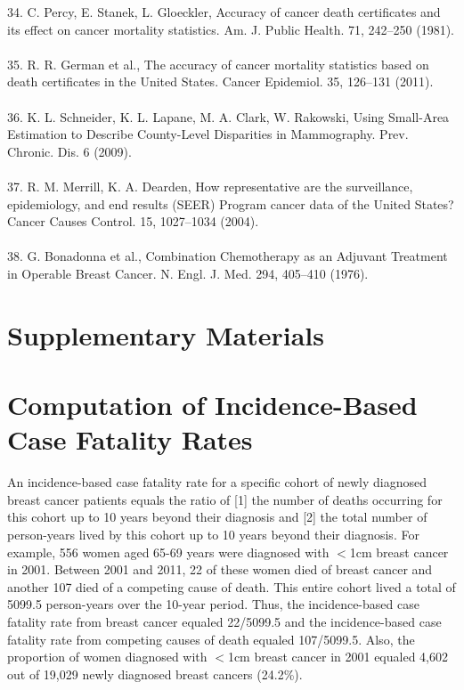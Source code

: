 \documentclass[11pt,letterpaper]{article}
\theoremstyle{plain}
\theoremstyle{remark}
\numberwithin{equation}{section}
\begin{document}
34. 	C. Percy, E. Stanek, L. Gloeckler, Accuracy of cancer death certificates and its effect on cancer mortality statistics. Am. J. Public Health. 71, 242–250 (1981). \\\\
35. 	R. R. German et al., The accuracy of cancer mortality statistics based on death certificates in the United States. Cancer Epidemiol. 35, 126–131 (2011). \\\\
36. 	K. L. Schneider, K. L. Lapane, M. A. Clark, W. Rakowski, Using Small-Area Estimation to Describe County-Level Disparities in Mammography. Prev. Chronic. Dis. 6 (2009).\\\\
37. 	R. M. Merrill, K. A. Dearden, How representative are the surveillance, epidemiology, and end results (SEER) Program cancer data of the United States? Cancer Causes Control. 15, 1027–1034 (2004). \\\\
38. 	G. Bonadonna et al., Combination Chemotherapy as an Adjuvant Treatment in Operable Breast Cancer. N. Engl. J. Med. 294, 405–410 (1976).










\setcounter{table}{0} %
\setcounter{figure}{0} %
\renewcommand{\figurename}{Supplemental Figure}
\renewcommand{\tablename}{Supplemental Table}
\appendix
\newpage
{}
\section*{Supplementary Materials}
\section{Computation of Incidence-Based Case Fatality Rates}
An incidence-based case fatality rate for a specific cohort of newly
diagnosed breast cancer patients equals the ratio of [1] the number of
deaths occurring for this cohort up to 10 years beyond their diagnosis
and [2] the total number of person-years lived by this cohort up to 10
years beyond their diagnosis.  For example, 556 women aged 65-69 years
were diagnosed with $<$1cm breast cancer in 2001.  Between 2001 and
2011, 22 of these women died of breast cancer and another 107 died of
a competing cause of death.  This entire cohort lived a total of
5099.5 person-years over the 10-year period.  Thus, the
incidence-based case fatality rate from breast cancer equaled
22/5099.5 and the incidence-based case fatality rate from competing
causes of death equaled 107/5099.5.  Also, the proportion of women
diagnosed with $<$1cm breast cancer in 2001 equaled 4,602 out of 19,029
newly diagnosed breast cancers (24.2\%).
\end{document}
